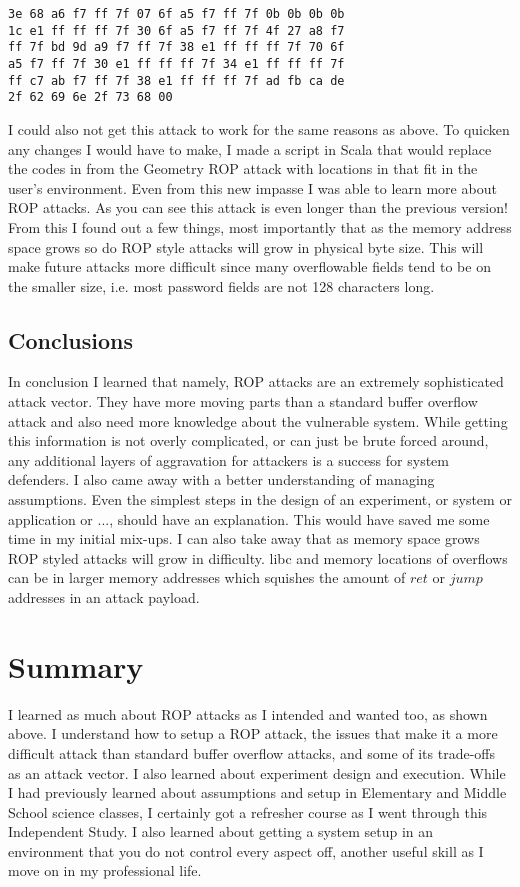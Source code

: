 \documentclass[11pt]{amsart}
\begin{document}
\begin{verbatim}
3e 68 a6 f7 ff 7f 07 6f a5 f7 ff 7f 0b 0b 0b 0b 
1c e1 ff ff ff 7f 30 6f a5 f7 ff 7f 4f 27 a8 f7 
ff 7f bd 9d a9 f7 ff 7f 38 e1 ff ff ff 7f 70 6f 
a5 f7 ff 7f 30 e1 ff ff ff 7f 34 e1 ff ff ff 7f 
ff c7 ab f7 ff 7f 38 e1 ff ff ff 7f ad fb ca de 
2f 62 69 6e 2f 73 68 00
\end{verbatim}
I could also not get this attack to work for the same reasons as above. To quicken any changes I would have to make, I made a script in Scala that would replace the codes in from the Geometry ROP attack with locations in that fit in the user's environment. Even from this new impasse I was able to learn more about ROP attacks. As you can see this attack is even longer than the previous version! From this I found out a few things, most importantly that as the memory address space grows so do ROP style attacks will grow in physical byte size. This will make future attacks more difficult since many overflowable fields tend to be on the smaller size, i.e. most password fields are not 128 characters long.
\subsection*{Conclusions}
In conclusion I learned that namely, ROP attacks are an extremely sophisticated attack vector. They have more moving parts than a standard buffer overflow attack and also need more knowledge about the vulnerable system. While getting this information is not overly complicated, or can just be brute forced around, any additional layers of aggravation for attackers is a success for system defenders. I also came away with a better understanding of managing assumptions. Even the simplest steps in the design of an experiment, or system or application or ..., should have an explanation. This would have saved me some time in my initial mix-ups. I can also take away that as memory space grows ROP styled attacks will grow in difficulty. libc and memory locations of overflows can be in larger memory addresses which squishes the amount of $ret$ or $jump$ addresses in an attack payload.
\section*{Summary}
I learned as much about ROP attacks as I intended and wanted too, as shown above. I understand how to setup a ROP attack, the issues that make it a more difficult attack than standard buffer overflow attacks, and some of its trade-offs as an attack vector. I also learned about experiment design and execution. While I had previously learned about assumptions and setup in Elementary and Middle School science classes, I certainly got a refresher course as I went through this Independent Study. I also learned about getting a system setup in an environment that you do not control every aspect off, another useful skill as I move on in my professional life.
\end{document}
